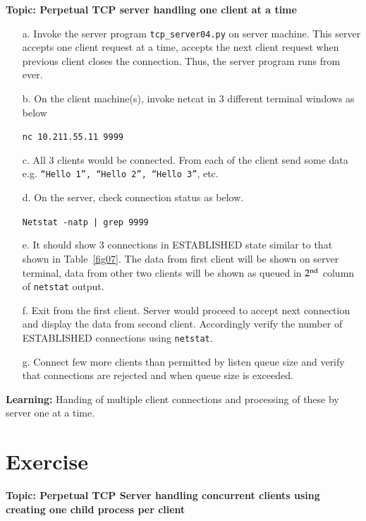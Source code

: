\begin{multicols}{2}
\textbf{Topic: Perpetual TCP server handling one client at a time}

\begin{itemize}

\item[a.] Invoke the server program \texttt{tcp\_server04.py} on server machine. This server accepts one client request at a time, accepts the next client request when previous client closes the connection. Thus, the server program runs from ever.

\item[b.] On the client machine(s), invoke netcat in 3 different terminal windows as below

\texttt{nc 10.211.55.11 9999}

\item[c.] All 3 clients would be connected. From each of the client send some data e.g. \texttt{“Hello 1”, “Hello 2”, “Hello 3”}, etc.

\item[d.] On the server, check connection status as below.

\texttt{Netstat -natp | grep 9999}

\item[e.] It should show 3 connections in ESTABLISHED state similar to that shown in Table~\ref{fig07}. The data from first client will be shown on server terminal, data from other two clients will be shown as queued in $2^{\rm nd}$ column of \texttt{netstat} output.

\item[f.] Exit from the first client. Server would proceed to accept next connection and display the data from second client. Accordingly verify the number of ESTABLISHED connections using \texttt{netstat}.

\item[g.] Connect few more clients than permitted by listen queue size and verify that connections are rejected and when queue size is exceeded.

\end{itemize}

\textbf{Learning:} Handing of multiple client connections and processing of these by server one at a time.

\section*{Exercise \label{chap1-exe03}}

\textbf{Topic: Perpetual TCP Server handling concurrent clients using creating one child process per client}


\end{multicols}
